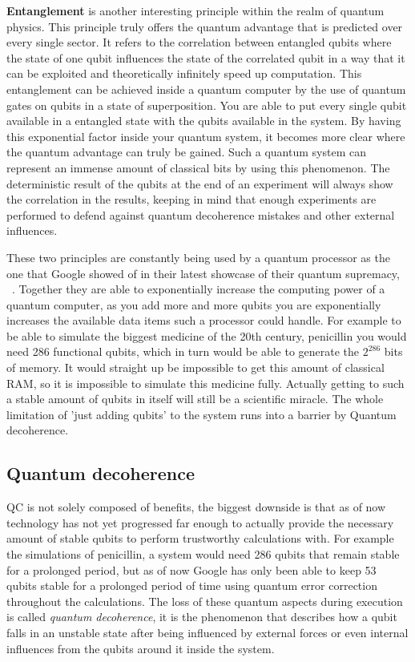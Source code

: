 \textbf{Entanglement} is another interesting principle within the realm of quantum physics. This principle truly offers the quantum advantage that is predicted over every single sector. 
It refers to the correlation between entangled qubits where the state of one qubit influences the state of the correlated qubit in a way that it can be exploited and theoretically infinitely speed up computation. This entanglement can be achieved inside a quantum computer by the use of quantum gates on qubits in a state of superposition. You are able to put every single qubit available in a entangled state with the qubits available in the system. By having this exponential factor inside your quantum system, it becomes more clear where the quantum advantage can truly be gained. Such a quantum system can represent an immense amount of classical bits by using this phenomenon. The deterministic result of the qubits at the end of an experiment will always show the correlation in the results, keeping in mind that enough experiments are performed to defend against quantum decoherence mistakes and other external influences.
~\autocite{fern2016mathematics}

These two principles are constantly being used  by a quantum processor as the one that Google showed of in their latest showcase of their quantum supremacy, ~\textcite{Google2019}. Together they are able to exponentially increase the computing power of a quantum computer, as you add more and more qubits you are exponentially increases the available data items such a processor could handle. For example to be able to simulate the biggest medicine of the 20th century, penicillin you would need 286 functional qubits, which in turn would be able to generate the $2^{286}$ bits of memory. It would straight up be impossible to get this amount of classical RAM, so it is impossible to simulate this medicine fully. Actually getting to such a stable amount of qubits in itself will still be a scientific miracle. The whole limitation of 'just adding qubits' to the system runs into a barrier by Quantum decoherence.

\subsection{Quantum decoherence}

QC is not solely composed of benefits, the biggest downside is that as of now technology has not yet progressed far enough to actually provide the necessary amount of stable qubits to perform trustworthy calculations with. For example the simulations of penicillin, a system would need 286 qubits that remain stable for a prolonged period, but as of now  Google has only been able to keep 53 qubits stable for a prolonged period of time using quantum error correction throughout the calculations. The loss of these quantum aspects during execution is called \textit{quantum decoherence}, it is the phenomenon that describes how a qubit falls in an unstable state after being influenced by external forces or even internal influences from the qubits around it inside the system.

